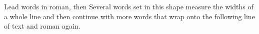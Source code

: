\documentclass{article}
\begin{document}
Lead words in roman, then {Several words set in this shape measure the widths of a whole line and then continue with more words that wrap onto the following line of text} and roman again.
\end{document}
